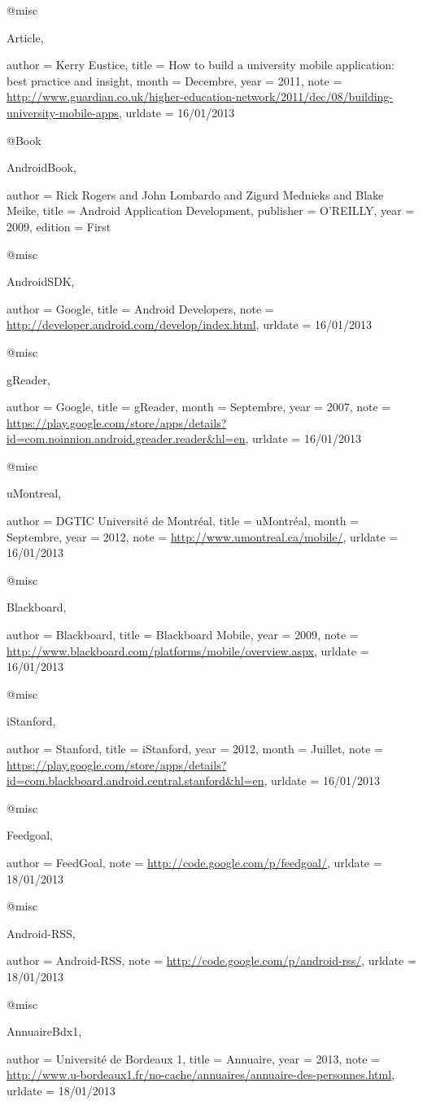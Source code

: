 @misc{Article,

author = {Kerry Eustice},
title = {How to build a university mobile application: best practice and insight},
month = {Decembre},
year = {2011},
note = {\url{http://www.guardian.co.uk/higher-education-network/2011/dec/08/building-university-mobile-apps}},
urldate = {16/01/2013}
}

@Book{AndroidBook,

author = {Rick Rogers and John Lombardo and Zigurd Mednieks and Blake Meike},
title = {Android Application Development},
publisher = {O'REILLY},
year = {2009},
edition = {First}
}

@misc{AndroidSDK,

author = {Google}, 
title = {Android Developers},
note = {\url{http://developer.android.com/develop/index.html}},
urldate = {16/01/2013}
}

@misc{gReader,

author = {Google}, 
title = {g{R}eader},
month = {Septembre},
year = {2007},
note = {\url{https://play.google.com/store/apps/details?id=com.noinnion.android.greader.reader&hl=en}},
urldate = {16/01/2013}
}

@misc{uMontreal,

author = {DGTIC Université de Montréal},
title = {u{M}ontréal},
month = {Septembre},
year = {2012},
note = {\url{http://www.umontreal.ca/mobile/}},
urldate = {16/01/2013}
}

@misc{Blackboard,

author = {Blackboard},
title = {Blackboard {M}obile},
year = {2009},
note = {\url{http://www.blackboard.com/platforms/mobile/overview.aspx}},
urldate = {16/01/2013}
}

@misc{iStanford,

author = {Stanford},
title = {i{S}tanford},
year = {2012},
month = {Juillet},
note = {\url{https://play.google.com/store/apps/details?id=com.blackboard.android.central.stanford&hl=en}},
urldate = {16/01/2013}
}

@misc{Feedgoal,

author = {FeedGoal},
note = {\url{http://code.google.com/p/feedgoal/}},
urldate = {18/01/2013}
}

@misc{Android-RSS,

author = {Android-RSS},
note = {\url{http://code.google.com/p/android-rss/}},
urldate = {18/01/2013}
}

@misc{AnnuaireBdx1,

author = {Université de Bordeaux 1},
title = {Annuaire},
year = {2013},
note = {\url{http://www.u-bordeaux1.fr/no-cache/annuaires/annuaire-des-personnes.html}},
urldate = {18/01/2013}
}

